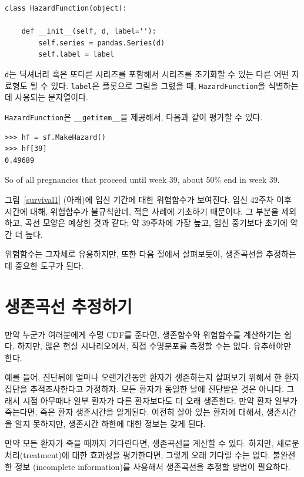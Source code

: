 \begin{verbatim}
class HazardFunction(object):

    def __init__(self, d, label=''):
        self.series = pandas.Series(d)
        self.label = label
\end{verbatim}

{\tt d}는 딕셔너리 혹은 또다른 시리즈를 포함해서 시리즈를 초기화할 수 있는 다른 어떤 자료형도 될 수 있다. {\tt label}은 플롯으로 그림을 그렸을 때, {\tt HazardFunction}을 식별하는데 사용되는 문자열이다.

{\tt HazardFunction}은 \verb"__getitem__"을 제공해서, 다음과 같이 평가할 수 있다.

\begin{verbatim}
>>> hf = sf.MakeHazard()
>>> hf[39]
0.49689
\end{verbatim}

So of all pregnancies that proceed until week 39, about
50\% end in week 39.

그림~\ref{survival1} (아래)에 임신 기간에 대한 위험함수가 보여진다.
임신 42주차 이후 시간에 대해, 위험함수가 불규칙한데, 적은 사례에 기초하기 때문이다. 그 부분을 제외하고, 곡선 모양은 예상한 것과 같다; 약 39주차에 가장 높고, 임신 중기보다 초기에 약간 더 높다.


위험함수는 그자체로 유용하지만, 또한 다음 절에서 살펴보듯이, 생존곡선을 추정하는데 중요한 도구가 된다.

\section{생존곡선 추정하기}

만약 누군가 여러분에게 수명 CDF를 준다면, 생존함수와 위험함수를 계산하기는 쉽다. 하지만, 많은 현실 시나리오에서, 직접 수명분포를 측정할 수는 없다.
유추해야만 한다.

예를 들어, 진단뒤에 얼마나 오랜기간동안 환자가 생존하는지 살펴보기 위해서 한 환자집단을 추적조사한다고 가정하자.
모든 환자가 동일한 날에 진단받은 것은 아니다. 그래서 시점 아무때나 일부 환자가 다른 환자보다도 더 오래 생존한다. 만약 환자 일부가 죽는다면, 죽은 환자 생존시간을 알게된다. 여전히 살아 있는 환자에 대해서, 생존시간을 알지 못하지만, 생존시간 하한에 대한 정보는 갖게 된다.

만약 모든 환자가 죽을 때까지 기다린다면, 생존곡선을 계산할 수 있다.
하지만, 새로운 처리(treatment)에 대한 효과성을 평가한다면, 그렇게 오래 기다릴 수는 없다. 불완전한 정보 (incomplete information)를 사용해서 생존곡선을 추정할 방법이 필요하다.

